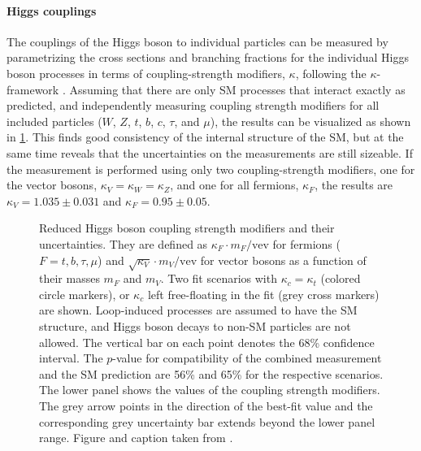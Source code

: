 \paragraph{Higgs couplings}
The couplings of the Higgs boson to individual particles can be measured by parametrizing the cross sections and branching fractions for the individual Higgs boson processes in terms of coupling-strength modifiers, $\kappa$, following the $\kappa$-framework \cite{LHCHandbookV3}. 
Assuming that there are only SM processes that interact exactly as predicted, and independently measuring coupling strength modifiers for all included particles ($W$, $Z$, $t$, $b$, $c$, $\tau$, and $\mu$), the results can be visualized as shown in \cref{fig:h-couplings}. 
This finds good consistency of the internal structure of the SM, but at the same time reveals that the uncertainties on the measurements are still sizeable. 
If the measurement is performed using only two coupling-strength modifiers, one for the vector bosons, $\kappa_V = \kappa_W = \kappa_Z$, and one for all fermions, $\kappa_F$, the results are $\kappa_V = 1.035 \pm 0.031$ and $\kappa_F = 0.95 \pm 0.05$. 

\begin{figure}
  \caption{
    Reduced Higgs boson coupling strength modifiers and their uncertainties. They are defined as $\kappa_F \cdot m_F / \text{vev}$ for fermions
($F=t,b,\tau,\mu$) and $\sqrt{\kappa_V}\cdot m_V/\text{vev}$ for vector bosons as a
function of their masses $m_F$ and $m_V$. Two fit scenarios with $\kappa_c =
\kappa_t$ (colored circle markers), or $\kappa_c$ left free-floating in the fit (grey
cross markers) are shown. Loop-induced processes are assumed to have the SM structure, and Higgs boson decays to non-SM particles are not allowed. The vertical bar on each point denotes the 68\% confidence interval. The $p$-value for compatibility of the combined measurement and the SM prediction are 56\% and 65\% for the respective scenarios. The lower panel shows the values of the coupling strength modifiers. The grey arrow points in the direction of the best-fit value and the corresponding grey uncertainty bar extends beyond the lower panel range. Figure and caption taken from .}
  \label{fig:h-couplings}
\end{figure}

